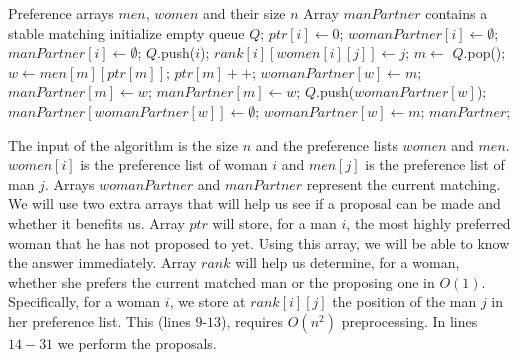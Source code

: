 \documentclass[12pt]{report}
\numberwithin{algorithm}{chapter}
\begin{document}
	\begin{algorithm}[H]
	\caption{Gale--Shapley Algorithm}
	\label{stableMarriageAlgorithm}
	\begin{algorithmic}[1]
		\Require Preference arrays $\mathit{men}$, $\mathit{women}$ and their size $n$
		\Ensure Array $\mathit{manPartner}$ contains a stable matching
		    \State initialize empty queue $Q$;
				\State $\mathit{ptr}[i] \gets 0$;
		        \State $\mathit{womanPartner}[i] \gets \emptyset$;
		        \State $\mathit{manPartner}[i] \gets \emptyset$;
		        \State $Q$.push($i$);
			\EndFor
			        \State $\mathit{rank}[i][\mathit{women}[i][j]] \gets j$;
			    \EndFor
			\EndFor
		        \State $m \gets$ $Q$.pop();
		            \State $w \gets \mathit{men}[m][\mathit{ptr}[m]]$;
		            \State $\mathit{ptr}[m]++$;
		                \State $\mathit{womanPartner}[w] \gets m$;
		                \State $\mathit{manPartner}[m] \gets w$;
		            \Else
		                    \State $\mathit{manPartner}[m] \gets w$;
		                    \State $Q$.push($\mathit{womanPartner}[w]$);
		                    \State $\mathit{manPartner}[\mathit{womanPartner}[w]] \gets \emptyset$;
		                    \State $\mathit{womanPartner}[w] \gets m$;
		                \EndIf
		            \EndIf
		        \EndWhile
		    \EndWhile
		    \State \Return $\mathit{manPartner}$;
		\EndFunction
	\end{algorithmic}
	\end{algorithm}

	The input of the algorithm is the size $n$ and the preference lists $\mathit{women}$ and $\mathit{men}$. $\mathit{women}[i]$ is the preference list of woman $i$ and $\mathit{men}[j]$ is the preference list of man $j$. Arrays $\mathit{womanPartner}$ and $\mathit{manPartner}$ represent the current matching. We will use two extra arrays that will help us see if a proposal can be made and whether it benefits us. Array $\mathit{ptr}$ will store, for a man $i$, the most highly preferred woman that he has not proposed to yet. Using this array, we will be able to know the answer immediately. Array $\mathit{rank}$ will help us determine, for a woman, whether she prefers the current matched man or the proposing one in $O(1)$. Specifically, for a woman $i$, we store at $\mathit{rank}[i][j]$ the position of the man $j$ in her preference list. This (lines $9$-$13$), requires $O(n^{2})$ preprocessing. In lines $14-31$ we perform the proposals. 
	
\end{document}

